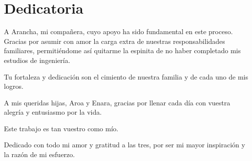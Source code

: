 \newpage
\section*{Dedicatoria}

A Arancha, mi compañera, cuyo apoyo ha sido fundamental en este proceso.
Gracias por asumir con amor la carga extra de nuestras responsabilidades familiares, permitiéndome así quitarme la
espinita de no haber completado mis estudios de ingeniería.

Tu fortaleza y dedicación son el cimiento de nuestra familia y de cada uno de mis logros.

A mis queridas hijas, Aroa y Enara, gracias por llenar cada día con vuestra alegría y entusiasmo por la vida.

Este trabajo es tan vuestro como mío.

Dedicado con todo mi amor y gratitud a las tres, por ser mi mayor inspiración y la razón de mi esfuerzo.

